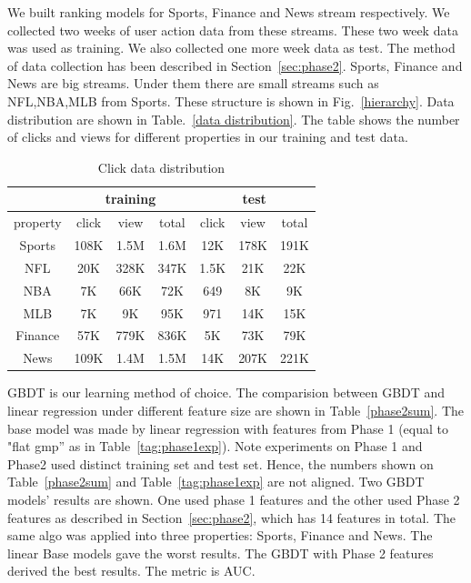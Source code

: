 We built ranking models for Sports, Finance and News stream respectively. We collected two weeks of user action data from these streams. These two week data was used as training. We also collected one more week data as test. The method of data collection has been described in Section~\ref{sec:phase2}. Sports, Finance and News are big streams. Under them there are small streams such as NFL,NBA,MLB from Sports. These structure is  shown in Fig.~\ref{hierarchy}. Data distribution are shown in Table.~\ref{data distribution}. The table shows the number of clicks and views for different properties in our training and test data. 



\begin{table}
\begin{center}
\caption{Click data distribution}
\begin{tabular}{|c|c|c|c|c|c|c|}\hline
 &  \multicolumn{3}{c|}{training} & \multicolumn{3}{c|}{test} \\ \hline
property     & click & view & total & click & view & total\\ \hline
Sports &  108K & 1.5M  & 1.6M & 12K & 178K & 191K \\ \hline
NFL &   20K & 328K  & 347K & 1.5K & 21K & 22K \\ \hline
NBA  &  7K & 66K & 72K & 649  & 8K & 9K \\ \hline
MLB & 7K & 9K & 95K & 971 &14K & 15K \\ \hline
Finance & 57K & 779K  & 836K & 5K &73K & 79K \\ \hline
News & 109K & 1.4M &1.5M  &14K &207K &221K \\ \hline
\end{tabular}

\end{center}
\end{table}
\label{data distribution}

GBDT is our learning method of choice.  The comparision between GBDT and linear regression under different feature size  are shown in Table~\ref{phase2sum}. The base model was made by linear regression with features from Phase 1 (equal to "flat gmp'' as in Table~\ref{tag:phase1exp}). Note experiments on Phase 1 and Phase2 used distinct training set and test set. Hence, the numbers shown on Table~\ref{phase2sum} and Table~\ref{tag:phase1exp} are not aligned. Two GBDT models' results  are shown. One used phase 1 features and the other used  Phase 2 features as described in Section~\ref{sec:phase2}, which has 14 features in total.  The same algo was applied into three properties: Sports, Finance and News.  The linear Base models gave the worst results. The GBDT with Phase 2 features derived the best results. The metric is AUC.  


